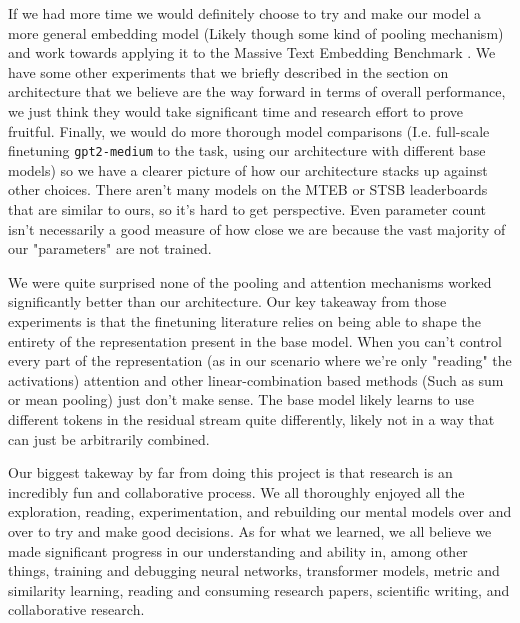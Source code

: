 \documentclass{article}
\begin{document}
If we had more time we would definitely choose to try and make our model a more general embedding model (Likely though some kind of pooling mechanism) and work towards applying it to the Massive Text Embedding Benchmark \cite{muennighoff2022mteb}. We have some other experiments that we briefly described in the section on architecture that we believe are the way forward in terms of overall performance, we just think they would take significant time and research effort to prove fruitful. Finally, we would do more thorough model comparisons (I.e. full-scale finetuning \verb|gpt2-medium| to the task, using our architecture with different base models) so we have a clearer picture of how our architecture stacks up against other choices. There aren't many models on the MTEB or STSB leaderboards that are similar to ours, so it's hard to get perspective. Even parameter count isn't necessarily a good measure of how close we are because the vast majority of our "parameters" are not trained.

We were quite surprised none of the pooling and attention mechanisms worked significantly better than our architecture. Our key takeaway from those experiments is that the finetuning literature relies on being able to shape the entirety of the representation present in the base model. When you can't control every part of the representation (as in our scenario where we're only "reading" the activations) attention and other linear-combination based methods (Such as sum or mean pooling) just don't make sense. The base model likely learns to use different tokens in the residual stream quite differently, likely not in a way that can just be arbitrarily combined.

Our biggest takeway by far from doing this project is that research is an incredibly fun and collaborative process. We all thoroughly enjoyed all the exploration, reading, experimentation, and rebuilding our mental models over and over to try and make good decisions. As for what we learned, we all believe we made significant progress in our understanding and ability in, among other things, training and debugging neural networks, transformer models, metric and similarity learning, reading and consuming research papers, scientific writing, and collaborative research.
\end{document}
